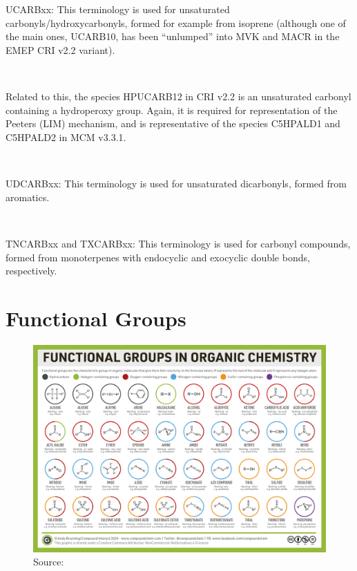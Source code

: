 {{\\}\\ \parbox{\textwidth}{
UCARBxx: This terminology is used for unsaturated carbonyls/hydroxycarbonyls, formed for example from isoprene (although one of the main ones, UCARB10, has been “unlumped” into MVK and MACR in the EMEP CRI v2.2 variant).
\\}\\ \parbox{\textwidth}{
Related to this, the species HPUCARB12 in CRI v2.2 is an unsaturated carbonyl containing a hydroperoxy group. Again, it is required for representation of the Peeters (LIM) mechanism, and is representative of the species C5HPALD1 and C5HPALD2 in MCM v3.3.1.
\\}\\ \parbox{\textwidth}{
UDCARBxx: This terminology is used for unsaturated dicarbonyls, formed from aromatics.
\\}\\ \parbox{\textwidth}{
TNCARBxx and TXCARBxx: This terminology is used for carbonyl compounds, formed from monoterpenes with endocyclic and exocyclic double bonds, respectively.

}}




\section{Functional Groups}\label{appendix:fngroups}
\begin{figure}[H]
\centering
\includegraphics[width=.9\textheight,angle=90]{fngroups.png}
{Source:\cite{fgps}}
\end{figure}
